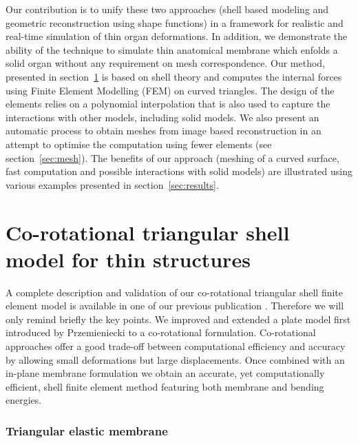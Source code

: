 \documentclass{llncs}
\begin{document}
Our contribution is to unify these two approaches (shell based modeling and geometric reconstruction using shape functions) in a framework  for realistic and real-time simulation of thin organ deformations. 
In addition, we demonstrate the ability of the technique to simulate thin anatomical membrane which enfolds a solid organ without any requirement on mesh correspondence.
Our method, presented in section~\ref{sec:model} is based on shell theory and computes the internal forces using Finite Element Modelling (FEM) on curved triangles. The design of the elements relies on a polynomial interpolation that is also used to capture the interactions with other models, including solid models. We also present an automatic process to obtain meshes from image based reconstruction in an attempt to optimise the computation using fewer elements (see section~\ref{sec:mesh}). The benefits of our approach (meshing of a curved surface, fast computation and possible interactions with solid models) are illustrated using various examples presented in section~\ref{sec:results}.

\section{Co-rotational triangular shell model for thin structures}
\label{sec:model}


A complete description and validation of our co-rotational triangular shell finite element model is available in one of our previous publication \cite{Comas2010ISBMS}. Therefore we will only remind briefly the key points. We improved and extended a plate model first introduced by Przemieniecki \cite{Przemieniecki68} to a co-rotational formulation. Co-rotational approaches offer a good trade-off between computational efficiency and accuracy by allowing small deformations but large displacements. Once combined with an in-plane membrane formulation we obtain an accurate, yet computationally efficient, shell finite element method featuring both membrane and bending energies. 

\subsubsection{Triangular elastic membrane}
\end{document}
